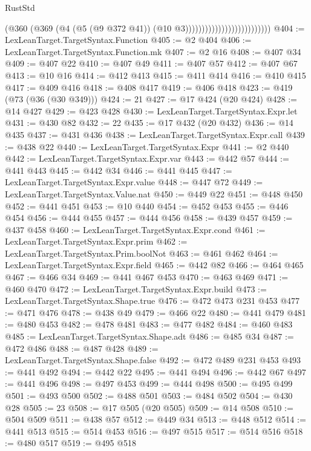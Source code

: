 \begin{lexlean}{RustStd}
\begin{coremodule}
                                                (@360
                                                  (@369
                                                    (@4
                                                      (@5 (@9 @372 @41))
                                                      (@10 @3))))))))))))))))))))))))))
@404 := LexLeanTarget.TargetSyntax.Function
@405 := @2 @404
@406 := LexLeanTarget.TargetSyntax.Function.mk
@407 := @2 @16
@408 := @407 @34
@409 := @407 @22
@410 := @407 @49
@411 := @407 @57
@412 := @407 @67
@413 := @10 @16
@414 := @412 @413
@415 := @411 @414
@416 := @410 @415
@417 := @409 @416
@418 := @408 @417
@419 := @406 @418
@423 := @419 (@73 (@36 (@30 @349)))
@424 := 21
@427 := @17 @424 (@20 @424)
@428 := @14 @427
@429 := @423 @428
@430 := LexLeanTarget.TargetSyntax.Expr.let
@431 := @430 @82
@432 := 22
@435 := @17 @432 (@20 @432)
@436 := @14 @435
@437 := @431 @436
@438 := LexLeanTarget.TargetSyntax.Expr.call
@439 := @438 @22
@440 := LexLeanTarget.TargetSyntax.Expr
@441 := @2 @440
@442 := LexLeanTarget.TargetSyntax.Expr.var
@443 := @442 @57
@444 := @441 @443
@445 := @442 @34
@446 := @441 @445
@447 := LexLeanTarget.TargetSyntax.Expr.value
@448 := @447 @72
@449 := LexLeanTarget.TargetSyntax.Value.nat
@450 := @449 @22
@451 := @448 @450
@452 := @441 @451
@453 := @10 @440
@454 := @452 @453
@455 := @446 @454
@456 := @444 @455
@457 := @444 @456
@458 := @439 @457
@459 := @437 @458
@460 := LexLeanTarget.TargetSyntax.Expr.cond
@461 := LexLeanTarget.TargetSyntax.Expr.prim
@462 := LexLeanTarget.TargetSyntax.Prim.boolNot
@463 := @461 @462
@464 := LexLeanTarget.TargetSyntax.Expr.field
@465 := @442 @82
@466 := @464 @465
@467 := @466 @34
@469 := @441 @467 @453
@470 := @463 @469
@471 := @460 @470
@472 := LexLeanTarget.TargetSyntax.Expr.build
@473 := LexLeanTarget.TargetSyntax.Shape.true
@476 := @472 @473 @231 @453
@477 := @471 @476
@478 := @438 @49
@479 := @466 @22
@480 := @441 @479
@481 := @480 @453
@482 := @478 @481
@483 := @477 @482
@484 := @460 @483
@485 := LexLeanTarget.TargetSyntax.Shape.adt
@486 := @485 @34
@487 := @472 @486
@488 := @487 @428
@489 := LexLeanTarget.TargetSyntax.Shape.false
@492 := @472 @489 @231 @453
@493 := @441 @492
@494 := @442 @22
@495 := @441 @494
@496 := @442 @67
@497 := @441 @496
@498 := @497 @453
@499 := @444 @498
@500 := @495 @499
@501 := @493 @500
@502 := @488 @501
@503 := @484 @502
@504 := @430 @28
@505 := 23
@508 := @17 @505 (@20 @505)
@509 := @14 @508
@510 := @504 @509
@511 := @438 @57
@512 := @449 @34
@513 := @448 @512
@514 := @441 @513
@515 := @514 @453
@516 := @497 @515
@517 := @514 @516
@518 := @480 @517
@519 := @495 @518

\end{coremodule}
\end{lexlean}
